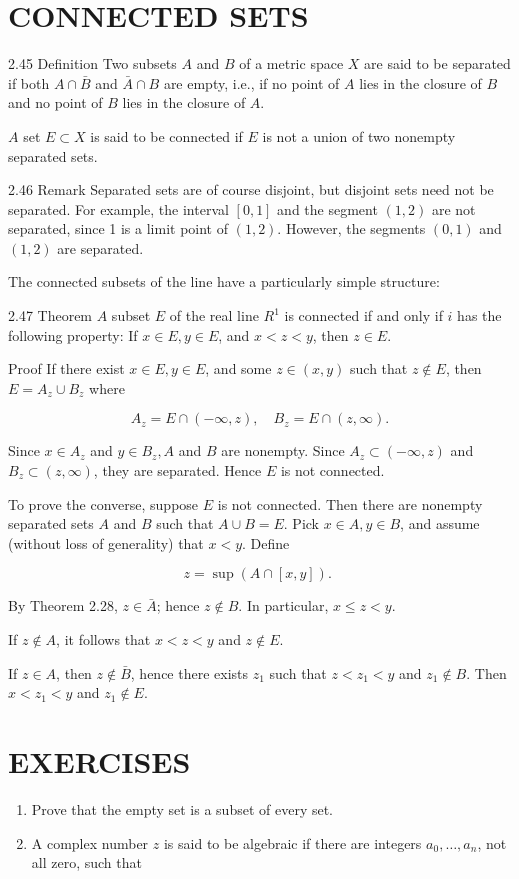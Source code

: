 \documentclass[10pt]{article}
\begin{document}
\section{CONNECTED SETS}
2.45 Definition Two subsets $A$ and $B$ of a metric space $X$ are said to be separated if both $A \cap \bar{B}$ and $\bar{A} \cap B$ are empty, i.e., if no point of $A$ lies in the closure of $B$ and no point of $B$ lies in the closure of $A$.

$A$ set $E \subset X$ is said to be connected if $E$ is not a union of two nonempty separated sets.

2.46 Remark Separated sets are of course disjoint, but disjoint sets need not be separated. For example, the interval $[0,1]$ and the segment $(1,2)$ are not separated, since 1 is a limit point of $(1,2)$. However, the segments $(0,1)$ and $(1,2)$ are separated.

The connected subsets of the line have a particularly simple structure:

2.47 Theorem $A$ subset $E$ of the real line $R^{1}$ is connected if and only if $i$ has the following property: If $x \in E, y \in E$, and $x<z<y$, then $z \in E$.

Proof If there exist $x \in E, y \in E$, and some $z \in(x, y)$ such that $z \notin E$, then $E=A_{z} \cup B_{z}$ where

$$
A_{z}=E \cap(-\infty, z), \quad B_{z}=E \cap(z, \infty) .
$$

Since $x \in A_{z}$ and $y \in B_{z}, A$ and $B$ are nonempty. Since $A_{z} \subset(-\infty, z)$ and $B_{z} \subset(z, \infty)$, they are separated. Hence $E$ is not connected.

To prove the converse, suppose $E$ is not connected. Then there are nonempty separated sets $A$ and $B$ such that $A \cup B=E$. Pick $x \in A, y \in B$, and assume (without loss of generality) that $x<y$. Define

$$
z=\sup (A \cap[x, y]) \text {. }
$$

By Theorem 2.28, $z \in \bar{A}$; hence $z \notin B$. In particular, $x \leq z<y$.

If $z \notin A$, it follows that $x<z<y$ and $z \notin E$.

If $z \in A$, then $z \notin \bar{B}$, hence there exists $z_{1}$ such that $z<z_{1}<y$ and $z_{1} \notin B$. Then $x<z_{1}<y$ and $z_{1} \notin E$.

\section{EXERCISES}
\begin{enumerate}
  \item Prove that the empty set is a subset of every set.

  \item A complex number $z$ is said to be algebraic if there are integers $a_{0}, \ldots, a_{n}$, not all zero, such that

\end{enumerate}
\end{document}
